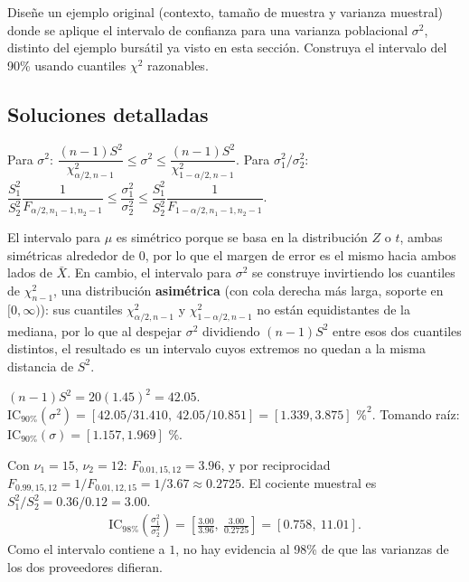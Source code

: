 \begin{problema}
	\label{prob:866061e}
	Diseñe un ejemplo original (contexto, tamaño de muestra y varianza muestral) donde se aplique el intervalo de confianza para una varianza poblacional $\sigma^2$, distinto del ejemplo bursátil ya visto en esta sección. Construya el intervalo del 90\% usando cuantiles $\chi^2$ razonables.
\end{problema}

\subsection*{Soluciones detalladas}

\begin{solproblema}[prob:05ea7a1]
	Para $\sigma^2$: $\dfrac{(n-1)S^2}{\chi^2_{\alpha/2,n-1}} \le \sigma^2 \le \dfrac{(n-1)S^2}{\chi^2_{1-\alpha/2,n-1}}$. Para $\sigma_1^2/\sigma_2^2$: $\dfrac{S_1^2}{S_2^2}\dfrac{1}{F_{\alpha/2,n_1-1,n_2-1}} \le \dfrac{\sigma_1^2}{\sigma_2^2} \le \dfrac{S_1^2}{S_2^2}\dfrac{1}{F_{1-\alpha/2,n_1-1,n_2-1}}$.
\end{solproblema}

\begin{solproblema}[prob:c70c188]
	El intervalo para $\mu$ es simétrico porque se basa en la distribución $Z$ o $t$, ambas simétricas alrededor de $0$, por lo que el margen de error es el mismo hacia ambos lados de $\bar X$. En cambio, el intervalo para $\sigma^2$ se construye invirtiendo los cuantiles de $\chi^2_{n-1}$, una distribución \textbf{asimétrica} (con cola derecha más larga, soporte en $[0,\infty)$): sus cuantiles $\chi^2_{\alpha/2,n-1}$ y $\chi^2_{1-\alpha/2,n-1}$ no están equidistantes de la mediana, por lo que al despejar $\sigma^2$ dividiendo $(n-1)S^2$ entre esos dos cuantiles distintos, el resultado es un intervalo cuyos extremos no quedan a la misma distancia de $S^2$.
\end{solproblema}

\begin{solproblema}[prob:fa97dc8]
	$(n-1)S^2 = 20(1.45)^2 = 42.05$. $\text{IC}_{90\%}(\sigma^2) = [42.05/31.410,\ 42.05/10.851] = [1.339, 3.875]\text{ \%}^2$. Tomando raíz: $\text{IC}_{90\%}(\sigma) = [1.157, 1.969]\text{ \%}$.
\end{solproblema}

\begin{solproblema}[prob:33162ae]
	Con $\nu_1=15$, $\nu_2=12$: $F_{0.01,15,12}=3.96$, y por reciprocidad $F_{0.99,15,12}=1/F_{0.01,12,15}=1/3.67\approx0.2725$. El cociente muestral es $S_1^2/S_2^2 = 0.36/0.12=3.00$.
	\begin{align*}
		\text{IC}_{98\%}\left(\frac{\sigma_1^2}{\sigma_2^2}\right) = \left[\frac{3.00}{3.96},\ \frac{3.00}{0.2725}\right] = [0.758,\ 11.01].
	\end{align*}
	Como el intervalo contiene a $1$, no hay evidencia al 98\% de que las varianzas de los dos proveedores difieran.
\end{solproblema}

